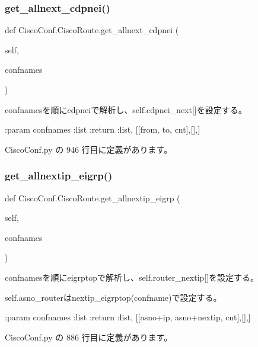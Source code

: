 \subsubsection{\texorpdfstring{get\_allnext\_cdpnei()}{get\_allnext\_cdpnei()}}
{\footnotesize\ttfamily def Cisco\+Conf.\+Cisco\+Route.\+get\+\_\+allnext\+\_\+cdpnei (\begin{DoxyParamCaption}\item[{}]{self,  }\item[{}]{confnames }\end{DoxyParamCaption})}

\begin{DoxyVerb}confnamesを順にcdpneiで解析し、self.cdpnei_next[]を設定する。

:param  confnames :list
:return :list, [[from, to, cnt],[],]
\end{DoxyVerb}
 

 Cisco\+Conf.\+py の 946 行目に定義があります。

\mbox{\label{classCiscoConf_1_1CiscoRoute_a645db136acb549afe73227236d184edd}} 
\subsubsection{\texorpdfstring{get\_allnextip\_eigrp()}{get\_allnextip\_eigrp()}}
{\footnotesize\ttfamily def Cisco\+Conf.\+Cisco\+Route.\+get\+\_\+allnextip\+\_\+eigrp (\begin{DoxyParamCaption}\item[{}]{self,  }\item[{}]{confnames }\end{DoxyParamCaption})}

\begin{DoxyVerb}confnamesを順にeigrptopで解析し、self.router_nextip[]を設定する。

self.asno_router{}はnextip_eigrptop(confname)で設定する。

:param  confnames :list
:return :list, [[asno+ip, asno+nextip, cnt],[],]
\end{DoxyVerb}
 

 Cisco\+Conf.\+py の 886 行目に定義があります。

\mbox{\label{classCiscoConf_1_1CiscoRoute_ae6779b3141da097bbba9ca2b15b07481}} 
